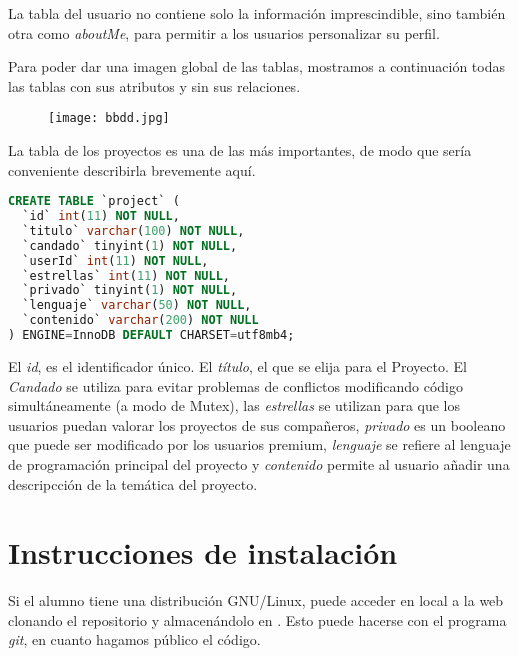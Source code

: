 \documentclass[12pt]{report}
\begin{document}
La tabla del usuario no contiene solo la información imprescindible, sino también otra como \textit{aboutMe}, para permitir a los usuarios personalizar su perfil.

Para poder dar una imagen global de las tablas, mostramos a continuación todas las tablas con sus atributos y sin sus relaciones.

\begin{figure}[!h]
 \centering
  \texttt{[image: bbdd.jpg]}
\end{figure}

La tabla de los proyectos es una de las más importantes, de modo que sería conveniente describirla brevemente aquí.

\begin{lstlisting}[language=SQL]
CREATE TABLE `project` (
  `id` int(11) NOT NULL,
  `titulo` varchar(100) NOT NULL,
  `candado` tinyint(1) NOT NULL,
  `userId` int(11) NOT NULL,
  `estrellas` int(11) NOT NULL,
  `privado` tinyint(1) NOT NULL,
  `lenguaje` varchar(50) NOT NULL,
  `contenido` varchar(200) NOT NULL
) ENGINE=InnoDB DEFAULT CHARSET=utf8mb4;

\end{lstlisting}

El \textit{id}, es el identificador único. El \textit{título}, el que se elija para el Proyecto. El \textit{Candado} se utiliza para evitar problemas de conflictos modificando código simultáneamente (a modo de Mutex), las \textit{estrellas} se utilizan para que los usuarios puedan valorar los proyectos de sus compañeros, \textit{privado} es un booleano que puede ser modificado por los usuarios premium, \textit{lenguaje} se refiere al lenguaje de programación principal del proyecto y \textit{contenido} permite al usuario añadir una descripcción de la temática del proyecto.


\section{Instrucciones de instalación}

Si el alumno tiene una distribución GNU/Linux, puede acceder en local a la web clonando el repositorio y almacenándolo en . Esto puede hacerse con el programa \textit{git}, en cuanto hagamos público el código.
\newline
\end{document}
